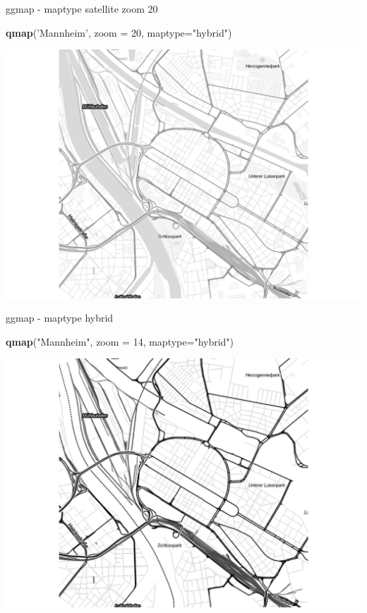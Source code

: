 \documentclass[ignorenonframetext,]{beamer}
\newenvironment{Shaded}{}{}
\newcommand{\KeywordTok}[1]{\textcolor[rgb]{0.00,0.44,0.13}{\textbf{{#1}}}}
\newcommand{\DataTypeTok}[1]{\textcolor[rgb]{0.56,0.13,0.00}{{#1}}}
\newcommand{\DecValTok}[1]{\textcolor[rgb]{0.25,0.63,0.44}{{#1}}}
\newcommand{\StringTok}[1]{\textcolor[rgb]{0.25,0.44,0.63}{{#1}}}
\newcommand{\NormalTok}[1]{{#1}}
\begin{document}
\begin{frame}[fragile]{ggmap - maptype satellite zoom 20}

\begin{Shaded}
\begin{Highlighting}[]
\KeywordTok{qmap}\NormalTok{(}\StringTok{'Mannheim'}\NormalTok{, }\DataTypeTok{zoom =} \DecValTok{20}\NormalTok{, }\DataTypeTok{maptype=}\StringTok{"hybrid"}\NormalTok{)}
\end{Highlighting}
\end{Shaded}

\includegraphics{R_intern_files/figure-beamer/unnamed-chunk-268-1.pdf}

\end{frame}

\begin{frame}[fragile]{ggmap - maptype hybrid}

\begin{Shaded}
\begin{Highlighting}[]
\KeywordTok{qmap}\NormalTok{(}\StringTok{"Mannheim"}\NormalTok{, }\DataTypeTok{zoom =} \DecValTok{14}\NormalTok{, }\DataTypeTok{maptype=}\StringTok{"hybrid"}\NormalTok{)}
\end{Highlighting}
\end{Shaded}

\includegraphics{R_intern_files/figure-beamer/unnamed-chunk-269-1.pdf}

\end{frame}
\end{document}
